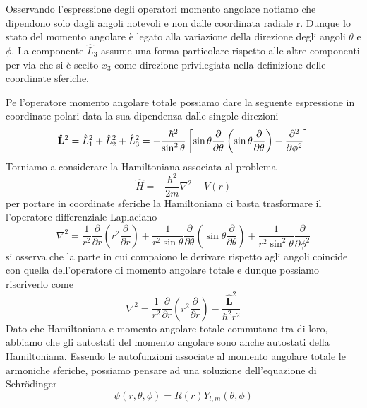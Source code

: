 Osservando l'espressione degli operatori momento angolare notiamo che dipendono solo dagli angoli notevoli e non dalle coordinata radiale r. Dunque lo stato del momento angolare \`e legato alla variazione della direzione degli angoli $\theta$ e $\phi$. La componente $\hat{L}_{3}$ assume una forma particolare rispetto alle altre componenti per via che si \`e scelto $x_3$ come direzione privilegiata nella definizione delle coordinate sferiche.
\newline

\noindent Pe l'operatore momento angolare totale possiamo dare la seguente espressione in coordinate polari data la sua dipendenza dalle singole direzioni 
\begin{equation}
	\bold{\hat{L}}^2 = \hat{L}_{1}^2 + \hat{L}_2^2 + \hat{L}_3^2 = - \frac{\hbar^2}{\sin^2 \theta} \left[ \sin\theta \frac{\partial}{\partial \theta} \left( \sin \theta \frac{\partial}{\partial \theta} \right) + \frac{\partial^2}{\partial \phi^2}\right]
\end{equation} 
Torniamo a considerare la Hamiltoniana associata al problema 
\begin{equation*}
	\hat{H} = - \frac{\hbar^2}{2m} \nabla^2  + V(r) 
\end{equation*}
per portare in coordinate sferiche la Hamiltoniana ci basta trasformare il l'operatore differenziale Laplaciano
\begin{equation}
\nabla^2=\frac{1}{r^2} \frac{\partial}{\partial r}\left(r^2 \frac{\partial}{\partial r}\right)+\frac{1}{r^2 \sin \theta} \frac{\partial}{\partial \theta}\left(\sin \theta \frac{\partial}{\partial \theta}\right)+\frac{1}{r^2 \sin ^2 \theta} \frac{\partial}{\partial \phi^2}
\end{equation}
si osserva che la parte in cui compaiono le derivare rispetto agli angoli coincide con quella dell'operatore di momento angolare totale e dunque possiamo riscriverlo come 
\begin{equation}
\nabla^2=\frac{1}{r^2} \frac{\partial}{\partial r}\left(r^2 \frac{\partial}{\partial r}\right)-\frac{\hat{\mathbf{L}}^2}{\hbar^2 r^2}
\end{equation}
Dato che Hamiltoniana e momento angolare totale commutano tra di loro, abbiamo che gli autostati del momento angolare sono anche autostati della Hamiltoniana. Essendo le autofunzioni associate al momento angolare totale le armoniche sferiche, possiamo pensare ad una soluzione dell'equazione di Schr\"odinger 
\begin{equation}
	\psi(r,\theta,\phi) = R(r)Y_{l,m}(\theta,\phi)
\end{equation}
